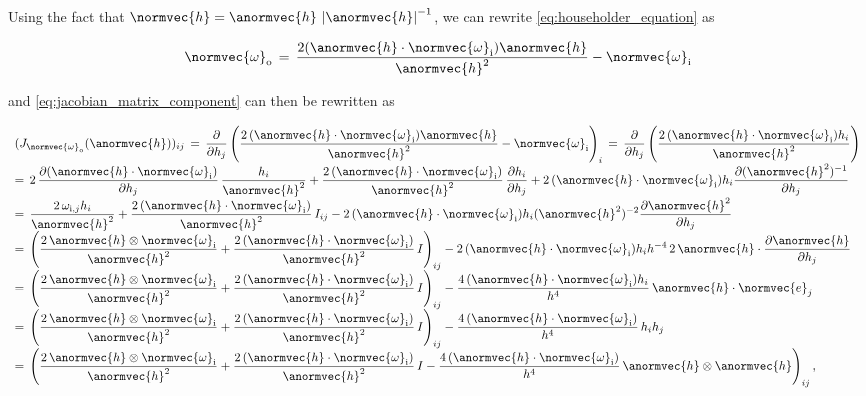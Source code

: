 {Using the fact that $\normvec{h} = \anormvec{h}\,\left|\anormvec{h}\right|^{-1}$, we can rewrite \eqref{eq:householder_equation} as

\begin{equation} 
\normvec{\omega}_{\text{o}} \,=\, \frac{2(\anormvec{h}\cdot\normvec{\omega}_{\text{i}})\anormvec{h}}{\anormvec{h}^2} - \normvec{\omega}_{\text{i}}
\end{equation}

and \eqref{eq:jacobian_matrix_component} can then be rewritten as

\begin{equation}
\renewcommand*{\arraystretch}{2}
\begin{array}{l}
\displaystyle (J_{\normvec{\omega}_{\text{o}}}(\anormvec{h}))_{ij} \,=\, \frac{\partial}{\partial h_{j}}\left(\frac{2\,(\anormvec{h}\cdot\normvec{\omega}_{\text{i}})\anormvec{h}}{\anormvec{h}^2} - \normvec{\omega}_{\text{i}}\right)_i  \,=\, \frac{\partial}{\partial h_{j}}\left(\frac{2\,(\anormvec{h}\cdot\normvec{\omega}_{\text{i}})h_i}{\anormvec{h}^2}\right) \\
\displaystyle =\, 2\,\frac{\partial(\anormvec{h}\cdot\normvec{\omega}_{\text{i}})}{\partial h_{j}}\,\frac{h_i}{\anormvec{h}^2} +
\frac{2\,(\anormvec{h}\cdot\normvec{\omega}_{\text{i}})}{\anormvec{h}^2}\,\frac{\partial h_i}{\partial h_{j}} +
2\,(\anormvec{h}\cdot\normvec{\omega}_{\text{i}})h_i\frac{\partial(\anormvec{h}^2)^{-1}}{\partial h_{j}} \\
\displaystyle =\, \frac{2\,\omega_{\text{i},j}h_i}{\anormvec{h}^2} +
\frac{2\,(\anormvec{h}\cdot\normvec{\omega}_{\text{i}})}{\anormvec{h}^2}\,I_{ij} -
2\,(\anormvec{h}\cdot\normvec{\omega}_{\text{i}})h_i(\anormvec{h}^2)^{-2} \frac{\partial\anormvec{h}^2}{\partial h_{j}} \\
\displaystyle =\, \left(
\frac{2\,\anormvec{h}\otimes\normvec{\omega}_{\text{i}}}{\anormvec{h}^2} +
\frac{2\,(\anormvec{h}\cdot\normvec{\omega}_{\text{i}})}{\anormvec{h}^2}\,I\right)_{ij} -
2\,(\anormvec{h}\cdot\normvec{\omega}_{\text{i}})h_i h^{-4}\,2\,\anormvec{h}\cdot\frac{\partial\anormvec{h}}{\partial h_{j}} \\
\displaystyle =\, \left(
\frac{2\,\anormvec{h}\otimes\normvec{\omega}_{\text{i}}}{\anormvec{h}^2} +
\frac{2\,(\anormvec{h}\cdot\normvec{\omega}_{\text{i}})}{\anormvec{h}^2}\,I\right)_{ij} -
\frac{4\,(\anormvec{h}\cdot\normvec{\omega}_{\text{i}})h_i}{h^4}\,\anormvec{h}\cdot\normvec{e}_j \\
\displaystyle =\, \left(
\frac{2\,\anormvec{h}\otimes\normvec{\omega}_{\text{i}}}{\anormvec{h}^2} +
\frac{2\,(\anormvec{h}\cdot\normvec{\omega}_{\text{i}})}{\anormvec{h}^2}\,I\right)_{ij} -
\frac{4\,(\anormvec{h}\cdot\normvec{\omega}_{\text{i}})}{h^4}\,h_i h_j \\
\displaystyle =\, \left(
\frac{2\,\anormvec{h}\otimes\normvec{\omega}_{\text{i}}}{\anormvec{h}^2} +
\frac{2\,(\anormvec{h}\cdot\normvec{\omega}_{\text{i}})}{\anormvec{h}^2}\,I -
\frac{4\,(\anormvec{h}\cdot\normvec{\omega}_{\text{i}})}{h^4}\,\anormvec{h}\otimes\anormvec{h}\right)_{ij},
\end{array}
\end{equation}

}
